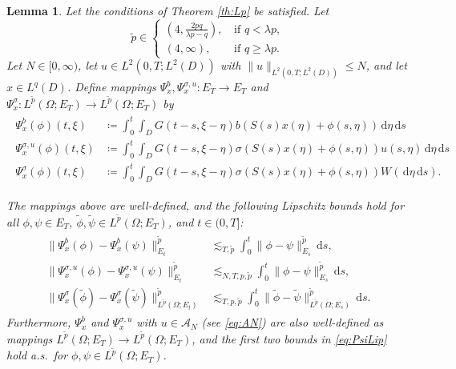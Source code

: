 \documentclass{amsart}
\theoremstyle{plain}
\theoremstyle{remark}
\theoremstyle{plain}
\newtheorem{lemma}[theorem]{Lemma}
\numberwithin{equation}{section}
\newcommand{\ceqq}{\coloneqq}
\newcommand{\col}{\colon}
\newcommand{\Om}{\Omega}
\newcommand{\A}{{\mathcal A}}
\newcommand{\dd}{\,\mathrm{d}}
\begin{document}
\begin{lemma}\label{lem:reg_ET}
Let the conditions of Theorem \ref{th:Lp} be satisfied. Let 
\[
\tilde{p}\in
\begin{cases}
(4,\frac{2pq}{\lambda p-q}), \, &\text{if } q<\lambda p,\\
(4,\infty), &\text{if } q\geq \lambda p. 
\end{cases}
\]  
Let  $N\in[0,\infty)$, let $u\in L^2(0,T;L^2(D))$ with $\|u\|_{L^2(0,T;L^2(D))}\leq N$, and let $x\in L^q(D)$. 
Define mappings $\Psi_x^b, \Psi_x^{\sigma,u}\col E_T \to E_T$  and $\Psi_x^\sigma\col L^{\tilde p}(\Om;E_T)\to L^{\tilde p}(\Om;E_T)$ by
\begin{align}\label{eq:defs Psi maps}
\begin{split}
    \Psi_x^b(\phi)(t,\xi) &\ceqq\int_0^t \int_D G(t-s,\xi-\eta) b(S(s)x(\eta) + \phi(s,\eta))\dd\eta \dd s\\
    \Psi_x^{\sigma,u}(\phi)(t,\xi) &\ceqq \int_0^t \int_D G(t-s,\xi-\eta) \sigma(S(s)x(\eta) + \phi(s,\eta) )u(s,\eta) \dd\eta \dd s\\
    \Psi_x^\sigma(\phi)(t,\xi) &\ceqq \int_0^t \int_D G(t-s,\xi-\eta) \sigma(S(s)x(\eta) + \phi(s,\eta))W(\dd\eta \dd s).
    \end{split}
\end{align}  

The mappings above are well-defined, and the following Lipschitz bounds hold for all   $\phi,\psi \in E_T$,   $\tilde\phi,\tilde\psi\in L^{\tilde p}(\Om;E_T)$, and $t\in(0,T]$:
\begin{align}\label{eq:PsiLip}
\begin{split}
\|\Psi_x^{b}(\phi)-\Psi_x^{b}(\psi)\|_{E_t}^{\tilde{p}} 
    &\lesssim_{T,\tilde p} \int_0^t \|\phi-\psi\|_{E_s}^{\tilde{p}}\dd s,\\ 
    \|\Psi_x^{\sigma,u}(\phi)-\Psi_x^{\sigma,u}(\psi)\|_{E_t}^{\tilde p} 
    &\lesssim_{N,T,p,\tilde p} \int_0^t \|\phi-\psi\|_{E_s}^{\tilde p} \dd s,\\ 
    \|\Psi_x^{\sigma}(\tilde\phi)-\Psi_x^{\sigma}(\tilde\psi)\|_{L^{\tilde{p}}(\Om;E_t)}^{\tilde{p}}
    &\lesssim_{T,p,\tilde p} \int_0^t \|\tilde\phi-\tilde\psi\|_{L^{\tilde{p}}(\Om;E_s)}^{\tilde{p}}\dd s.  
 \end{split}
 \end{align}   
Furthermore,  $\Psi_x^b$ and $\Psi_x^{\sigma,u}$ with $u\in \A_N$ (see \eqref{eq:AN}) are also well-defined as mappings $L^{\tilde p}(\Om;E_T)\to L^{\tilde p}(\Om;E_T)$, and the first two bounds in \eqref{eq:PsiLip} hold a.s.\ for $\phi,\psi\in L^{\tilde p}(\Om;E_T)$. 
\end{lemma} 
\end{document}
